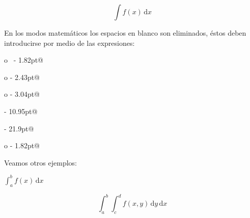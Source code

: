 \documentclass[letterpaper,12pt]{article}
\begin{document}
$$\int \! f(x) \, \mathrm{d}x $$

En los modos matemáticos los espacios en blanco son eliminados, éstos deben introducirse por medio de las expresiones:

\verb@\thinspace o \, - 1.82pt@

\verb@\medspace o \: - 2.43pt@

\verb@\thickspace o \; - 3.04pt@

\verb@\quad - 10.95pt@

\verb@\qquad - 21.9pt@

\verb@\thinspace o \! - 1.82pt@

Veamos otros ejemplos:

$\displaystyle \int_a^b f(x) \, \mathrm{d}x $

\[ \int_a^b \int_c^d {f(x,y) \, \mathrm{d}y} \, \mathrm{d}x \]
\end{document}
